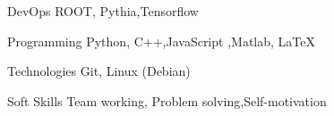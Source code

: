 

\begin{cvskills}

  \cvskill
    {DevOps} %
    {ROOT, Pythia,Tensorflow} %


  \cvskill
    {Programming} %
    { Python, C++,JavaScript ,Matlab, \LaTeX} %

  \cvskill
    {Technologies} %
    { Git,  Linux (Debian)} %

      \cvskill
    {Soft Skills} %
    {Team working, Problem solving,Self-motivation} %


\end{cvskills}

